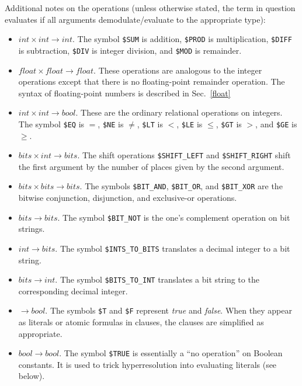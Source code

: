 \documentclass[11pt]{article}
\begin{document}
Additional notes on the operations (unless otherwise stated, the
term in question evaluates if all arguments demodulate/evaluate to the
appropriate type):
\begin{itemize}
\item
$int \times int \rightarrow int$.
The symbol \verb:$SUM: is addition, \verb:$PROD: is multiplication,
\verb:$DIFF: is subtraction, \verb:$DIV: is integer division,
and \verb:$MOD: is remainder.
\item
$float \times float \rightarrow float$.
These operations are analogous to the integer operations except
that there is no floating-point remainder operation.
The syntax of floating-point numbers is described in Sec.~\ref{float}
\item
$int \times int \rightarrow bool$.
These are the ordinary relational operations on integers.
The symbol \verb:$EQ: is $=$, \verb:$NE: is $\neq$,
\verb:$LT: is $<$, \verb:$LE: is $\leq$,
\verb:$GT: is $>$,  and \verb:$GE: is $\geq$.
\item
$bits \times int \rightarrow bits$.  The shift operations
\verb:$SHIFT_LEFT: and \verb:$SHIFT_RIGHT: shift the first
argument by the number of places given by the second argument.
\item
$bits \times bits\rightarrow bits$.
The symbols \verb:$BIT_AND:, \verb:$BIT_OR:, and \verb:$BIT_XOR:
are the bitwise conjunction, disjunction, and exclusive-or operations.
\item
$bits \rightarrow bits$.
The symbol \verb:$BIT_NOT: is the one's complement operation on bit strings.
\item
$int \rightarrow bits$.
The symbol \verb:$INTS_TO_BITS: translates a decimal integer
to a bit string.
\item
$bits \rightarrow int$.
The symbol \verb:$BITS_TO_INT: translates a bit string to the corresponding
decimal integer.
\item
$\rightarrow bool$.
The symbols \verb:$T: and \verb:$F: represent {\em true} and {\em false}.
When they appear as literals or atomic formulas in clauses, the
clauses are simplified as appropriate.
\item
$bool \rightarrow bool$.
The symbol \verb:$TRUE: is essentially a ``no operation'' on Boolean
constants.  It is used to trick hyperresolution into evaluating literals
(see below).


\end{itemize}
\end{document}
